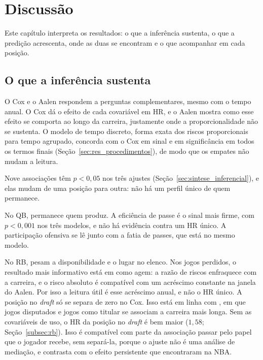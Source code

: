 
\chapter{Discussão}
\label{cap:discussao}

Este capítulo interpreta os resultados: o que a inferência sustenta, o que a predição acrescenta, onde as duas se encontram e o que acompanhar em cada posição.

\section{O que a inferência sustenta}
\label{sec:disc_inferencia}

O Cox e o Aalen respondem a perguntas complementares, mesmo com o tempo anual. O Cox dá o efeito de cada covariável em HR, e o Aalen mostra como esse efeito se comporta ao longo da carreira, justamente onde a proporcionalidade não se sustenta. O modelo de tempo discreto, forma exata dos riscos proporcionais para tempo agrupado, concorda com o Cox em sinal e em significância em todos os termos finais (Seção~\ref{sec:res_procedimentos}), de modo que os empates não mudam a leitura.

Nove associações têm $p<0{,}05$ nos três ajustes (Seção~\ref{sec:sintese_inferencial}), e elas mudam de uma posição para outra: não há um perfil único de quem permanece.

No QB, permanece quem produz. A eficiência de passe é o sinal mais firme, com $p<0{,}001$ nos três modelos, e não há evidência contra um HR único. A participação ofensiva se lê junto com a fatia de passes, que está no mesmo modelo.

No RB, pesam a disponibilidade e o lugar no elenco. Nos jogos perdidos, o resultado mais informativo está em como agem: a razão de riscos enfraquece com a carreira, e o risco absoluto é compatível com um acréscimo constante na janela do Aalen. Por isso a leitura útil é esse acréscimo anual, e não o HR único. A posição no \textit{draft} só se separa de zero no Cox. Isso está em linha com \citet{ducking2015}, em que jogos disputados e jogos como titular se associam a carreira mais longa. Sem as covariáveis de uso, o HR da posição no \textit{draft} é bem maior ($1{,}58$; Seção~\ref{subsec:rb}). Isso é compatível com parte da associação passar pelo papel que o jogador recebe, sem separá-la, porque o ajuste não é uma análise de mediação, e contrasta com o efeito persistente que \citet{staw1995} encontraram na NBA.

